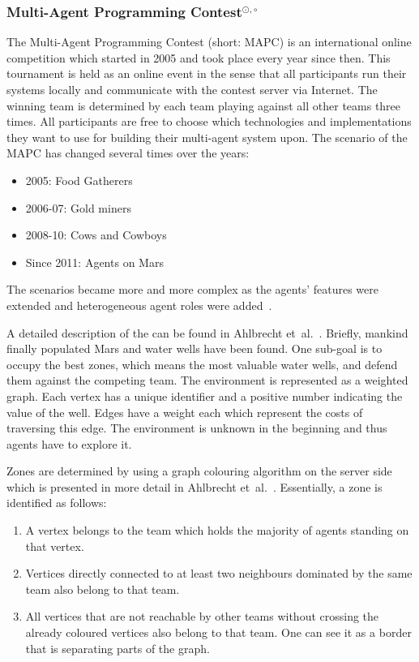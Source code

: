 \subsubsection[Multi-Agent Programming Contest]{Multi-Agent Programming Contest$^{\odot,\circ}$}\label{fun:mapc_general}
The Multi-Agent Programming Contest (short: MAPC) is an international online competition which started in 2005 and took place every year since then.
This tournament is held as an online event in the sense that all participants run their systems locally and communicate with the contest server via Internet.
The winning team is determined by each team playing against all other teams three times.
All participants are free to choose which technologies and implementations they want to use for building their multi-agent system upon.
The scenario of the MAPC has changed several times over the years:
\begin{itemize}
	\item 2005: Food Gatherers
	\item 2006-07: Gold miners
	\item 2008-10: Cows and Cowboys
  \item Since 2011: Agents on Mars
\end{itemize}
The scenarios became more and more complex as the agents' features were extended and heterogeneous agent roles were added~\cite{behrens_multi-agent_2012}. %

A detailed description of the \mars{} can be found in Ahlbrecht et~al.~\cite{ahlbrecht_mapc_2014}.
Briefly, mankind finally populated Mars and water wells have been found.
One sub-goal is to occupy the best zones, which means the most valuable water wells, and defend them against the competing team.
The environment is represented as a weighted graph.
Each vertex has a unique identifier and a positive number indicating the value of the well.
Edges have a weight each which represent the costs of traversing this edge.
The environment is unknown in the beginning and thus agents have to explore it.

Zones are determined by using a graph colouring algorithm on the server side which is presented in more detail in Ahlbrecht et~al.~\cite{ahlbrecht_mapc_2014}.
Essentially, a zone is identified as follows:
\begin{enumerate}
	\item A vertex belongs to the team which holds the majority of agents standing on that vertex.
	\item Vertices directly connected to at least two neighbours dominated by the same team also belong to that team.
	\item All vertices that are not reachable by other teams without crossing the already coloured vertices also belong to that team.
    One can see it as a border that	is separating parts of the graph.
\end{enumerate}

